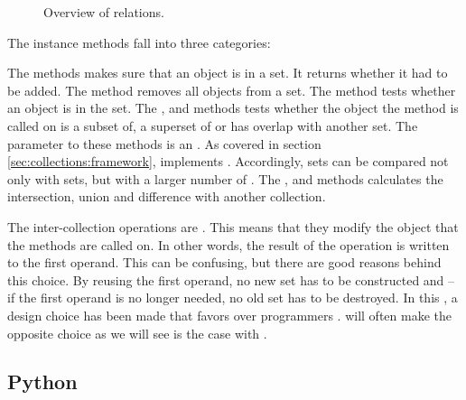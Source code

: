 \begin{figure}[tbp]
  
  \caption{Overview of relations.}
  \label{fig:collections:set:overview}
\end{figure}

The instance methods fall into three categories:
\begin{enumerate}
   The  methods makes sure that an object is in a set. It returns whether it had to be added. The  method removes all objects from a set. The  method tests whether an object is in the set.
   The ,  and  methods tests whether the object the method is called on is a subset of, a superset of or has overlap with another set. The parameter to these methods is an . As covered in section \ref{sec:collections:framework},  implements . Accordingly, sets can be compared not only with sets, but with a larger number of .
   The ,  and  methods calculates the intersection, union and difference with another collection.
\end{enumerate}

The inter-collection operations are . This means that they modify the object that the methods are called on. In other words, the result of the operation is written to the first operand. This can be confusing, but there are good reasons behind this choice. By reusing the first operand, no new set has to be constructed and -- if the first operand is no longer needed, no old set has to be destroyed. In this , a design choice has been made that favors  over programmers .  will often make the opposite choice as we will see is the case with .

\subsection{Python}

